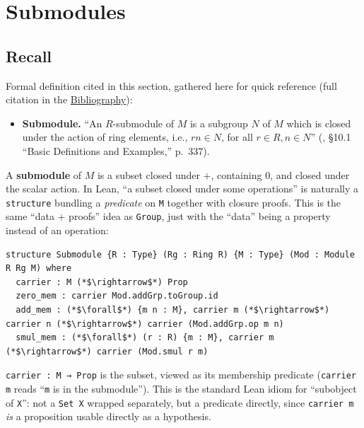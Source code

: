 \section{Submodules}\label{sec:10-modules:04-submodules:1}

\subsection{Recall}\label{sec:10-modules:04-submodules:0b}

Formal definition cited in this section, gathered here for quick reference (full citation in the \hyperref[sec:root:bibliography:1]{Bibliography}):

\begin{itemize}
\tightlist
\item
  \textbf{Submodule.} ``An \(R\)-submodule of \(M\) is a subgroup \(N\) of \(M\) which is closed under the action of ring elements, i.e., \(rn \in N\), for all \(r \in R, n \in N\)'' (\cite{DummitFoote2003}, §10.1 ``Basic Definitions and Examples,'' p.~337).
\end{itemize}

A \textbf{submodule} of \(M\) is a subset closed under \(+\), containing \(0\), and closed under the scalar action. In Lean, ``a subset closed under some operations'' is naturally a \texttt{structure} bundling a \emph{predicate} on \texttt{M} together with closure proofs. This is the same ``data + proofs'' idea as \texttt{Group}, just with the ``data'' being a property instead of an operation:

\begin{lstlisting}
structure Submodule {R : Type} (Rg : Ring R) {M : Type} (Mod : Module R Rg M) where
  carrier : M (*$\rightarrow$*) Prop
  zero_mem : carrier Mod.addGrp.toGroup.id
  add_mem : (*$\forall$*) {m n : M}, carrier m (*$\rightarrow$*) carrier n (*$\rightarrow$*) carrier (Mod.addGrp.op m n)
  smul_mem : (*$\forall$*) (r : R) {m : M}, carrier m (*$\rightarrow$*) carrier (Mod.smul r m)
\end{lstlisting}

\texttt{carrier : M → Prop} is the subset, viewed as its membership predicate (\texttt{carrier m} reads ``\texttt{m} is in the submodule''). This is the standard Lean idiom for ``subobject of \texttt{X}'': not a \texttt{Set X} wrapped separately, but a predicate directly, since \texttt{carrier m} \emph{is} a proposition usable directly as a hypothesis.

